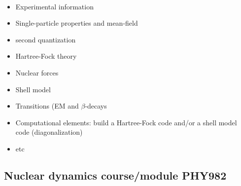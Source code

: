 \documentclass[%
twoside,                 %
final,                   %
10pt]{article}
\begin{document}
\paragraph{}
\begin{itemize}
\item Experimental information

\item Single-particle properties and mean-field

\item second quantization

\item Hartree-Fock theory

\item Nuclear forces

\item Shell model

\item Transitions (EM and $\beta$-decays

\item Computational elements: build a Hartree-Fock code and/or a shell model code (diagonalization)

\item etc
\end{itemize}

\noindent



\subsection{Nuclear dynamics course/module  PHY982}

\paragraph{}
\end{document}
